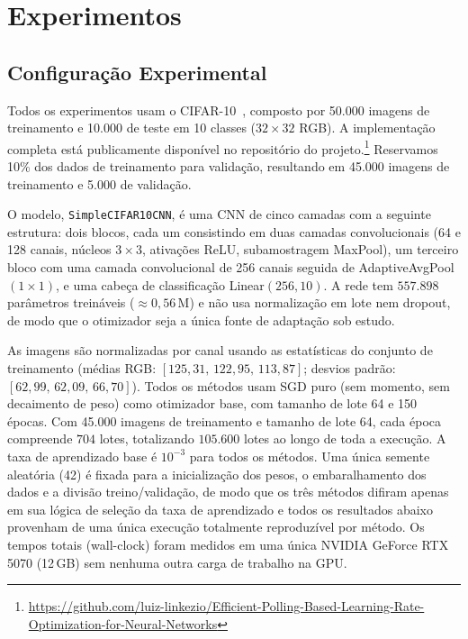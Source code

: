 \documentclass[conference]{IEEEtran}
\begin{document}
\section{Experimentos}

\subsection{Configuração Experimental}

Todos os experimentos usam o CIFAR-10~\cite{krizhevsky2009cifar}, composto por 50{.}000 imagens de treinamento e 10{.}000 de teste em 10 classes ($32\!\times\!32$ RGB). A implementação completa está publicamente disponível no repositório do projeto.\footnote{\url{https://github.com/luiz-linkezio/Efficient-Polling-Based-Learning-Rate-Optimization-for-Neural-Networks}} Reservamos 10\% dos dados de treinamento para validação, resultando em 45{.}000 imagens de treinamento e 5{.}000 de validação.

O modelo, \texttt{SimpleCIFAR10CNN}, é uma CNN de cinco camadas com a seguinte estrutura: dois blocos, cada um consistindo em duas camadas convolucionais (64 e 128 canais, núcleos $3\!\times\!3$, ativações ReLU, subamostragem MaxPool), um terceiro bloco com uma camada convolucional de 256 canais seguida de AdaptiveAvgPool$(1\!\times\!1)$, e uma cabeça de classificação Linear$(256, 10)$. A rede tem $557{.}898$ parâmetros treináveis ($\approx 0{,}56$\,M) e não usa normalização em lote nem dropout, de modo que o otimizador seja a única fonte de adaptação sob estudo.

As imagens são normalizadas por canal usando as estatísticas do conjunto de treinamento (médias RGB: $[125{,}31,\, 122{,}95,\, 113{,}87]$; desvios padrão: $[62{,}99,\, 62{,}09,\, 66{,}70]$). Todos os métodos usam SGD puro (sem momento, sem decaimento de peso) como otimizador base, com tamanho de lote 64 e 150 épocas. Com 45{.}000 imagens de treinamento e tamanho de lote 64, cada época compreende $704$ lotes, totalizando $105{.}600$ lotes ao longo de toda a execução. A taxa de aprendizado base é $10^{-3}$ para todos os métodos. Uma única semente aleatória (42) é fixada para a inicialização dos pesos, o embaralhamento dos dados e a divisão treino/validação, de modo que os três métodos difiram apenas em sua lógica de seleção da taxa de aprendizado e todos os resultados abaixo provenham de uma única execução totalmente reproduzível por método. Os tempos totais (wall-clock) foram medidos em uma única NVIDIA GeForce RTX 5070 (12\,GB) sem nenhuma outra carga de trabalho na GPU.
\end{document}
